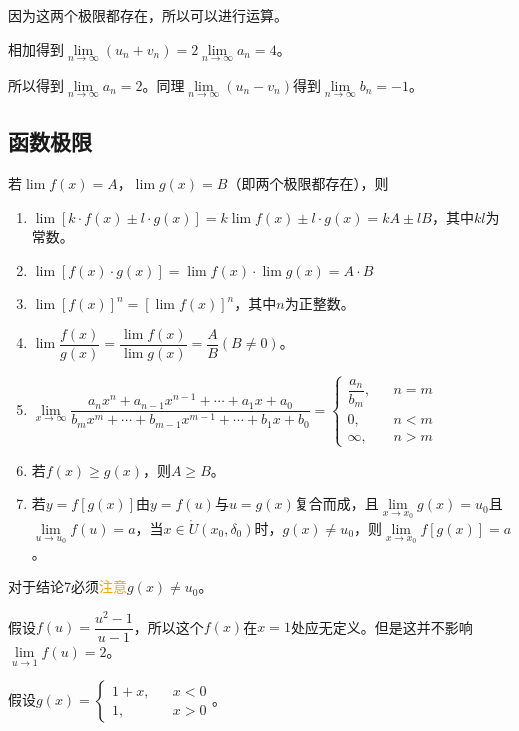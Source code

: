 \documentclass[UTF8, 12pt]{ctexart}
\begin{document}
因为这两个极限都存在，所以可以进行运算。

相加得到$\lim\limits_{n\to\infty}(u_n+v_n)=2\lim\limits_{n\to\infty}a_n=4$。

所以得到$\lim\limits_{n\to\infty}a_n=2$。同理$\lim\limits_{n\to\infty}(u_n-v_n)$得到$\lim\limits_{n\to\infty}b_n=-1$。

\subsection{函数极限}

若$\lim f(x)=A$，$\lim g(x)=B$（即两个极限都存在），则

\begin{enumerate}
    \item $\lim[k\cdot f(x)\pm l\cdot g(x)]=k\lim f(x)\pm l\cdot g(x)=kA\pm lB$，其中$kl$为常数。
    \item $\lim[f(x)\cdot g(x)]=\lim f(x)\cdot\lim g(x)=A\cdot B$
    \item $\lim[f(x)]^n=[\lim f(x)]^n$，其中$n$为正整数。
    \item $\lim\dfrac{f(x)}{g(x)}=\dfrac{\lim f(x)}{\lim g(x)}=\dfrac{A}{B}(B\neq 0)$。
    \item $\lim\limits_{x\to\infty}\dfrac{a_nx^n+a_{n-1}x^{n-1}+\cdots+a_1x+a_0}{b_mx^m+\cdots+b_{m-1}x^{m-1}+\cdots+b_1x+b_0}=\left\{
        \begin{array}{lcl}
            \dfrac{a_n}{b_m}, & & n=m \\
            0, & & n<m \\
            \infty, & & n>m
        \end{array}
    \right.$
    \item 若$f(x)\geqslant g(x)$，则$A\geqslant B$。
    \item 若$y=f[g(x)]$由$y=f(u)$与$u=g(x)$复合而成，且$\lim\limits_{x\to x_0}g(x)=u_0$且$\lim\limits_{u\to u_0}f(u)=a$，当$x\in\mathring{U}(x_0,\delta_0)$时，$g(x)\neq u_0$，则$\lim\limits_{x\to x_0}f[g(x)]=a$。 
\end{enumerate}

对于结论7必须\textcolor{orange}{注意}$g(x)\neq u_0$。

假设$f(u)=\dfrac{u^2-1}{u-1}$，所以这个$f(x)$在$x=1$处应无定义。但是这并不影响$\lim\limits_{u\to 1}f(u)=2$。

假设$g(x)=\left\{
    \begin{array}{lcl}
        1+x, & & x<0 \\
        1, & & x>0
    \end{array}
\right.$。
\end{document}
